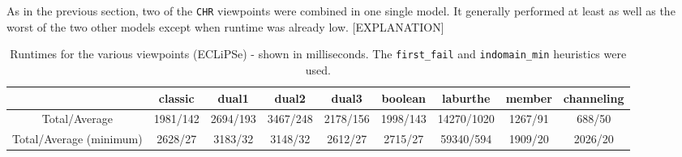 As in the previous section, two of the \texttt{CHR} viewpoints were combined in one single model. It generally performed at least as well as the worst of the two other models except when runtime was already low. [EXPLANATION]

\newpage
\begin{table}[h]
\footnotesize
\bgroup
\def\arraystretch{1.3}
\begin{tabular}{ccccccccc}
\multicolumn{1}{l}{} & classic & dual1 & dual2 & dual3 & boolean & laburthe & member & channeling \\ \hline
Total/Average & 1981/142 & 2694/193 & 3467/248 & 2178/156 & 1998/143 & 14270/1020 & 1267/91 & 688/50 \\
Total/Average (minimum) & 2628/27 & 3183/32 & 3148/32 & 2612/27 & 2715/27 & 59340/594 & 1909/20 & 2026/20
\end{tabular}
\egroup
\caption{Runtimes for the various viewpoints (ECLiPSe) - shown in milliseconds. The \texttt{first\_fail} and \texttt{indomain\_min} heuristics were used.}
\label{tab:res1}
\end{table}

